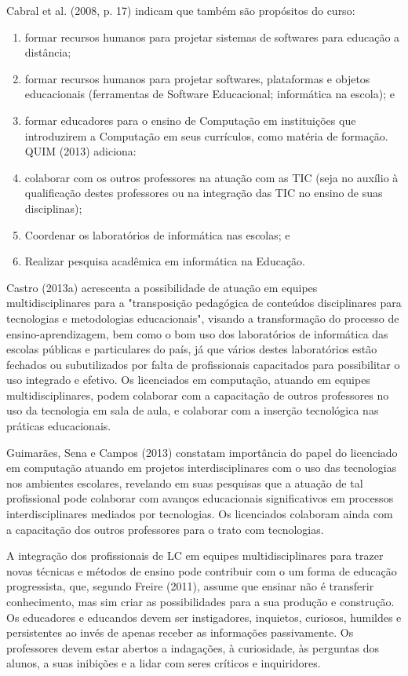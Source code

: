	Cabral et al. (2008, p. 17) indicam que também são propósitos do curso: 
    \begin{enumerate}
	\item formar recursos humanos para projetar sistemas de softwares para educação a distância; 
	\item formar recursos humanos para projetar softwares, plataformas e objetos educacionais (ferramentas de Software Educacional; informática na escola); e 
	\item formar educadores para o ensino de Computação em instituições que introduzirem a Computação em seus currículos, como matéria de formação. 
	QUIM (2013) adiciona:
	\item colaborar com os outros professores na atuação com as TIC (seja no auxílio à qualificação destes professores ou na integração das TIC no ensino de suas disciplinas);
	\item Coordenar os laboratórios de informática nas escolas; e
	\item Realizar pesquisa acadêmica em informática na Educação.
    \end{enumerate}
 
Castro (2013a) acrescenta a possibilidade de atuação em equipes multidisciplinares para a  "transposição pedagógica de conteúdos disciplinares para tecnologias e metodologias educacionais", visando a transformação do processo de ensino-aprendizagem, bem como o bom uso dos laboratórios de informática das escolas públicas e particulares do país, já que vários destes laboratórios estão fechados ou subutilizados por falta de profissionais capacitados para possibilitar o uso integrado e efetivo. Os licenciados em computação, atuando em equipes multidisciplinares, podem colaborar com a capacitação de outros professores no uso da tecnologia em sala de aula, e colaborar com a inserção tecnológica nas práticas educacionais. 


Guimarães, Sena e Campos (2013) constatam importância do papel do licenciado em computação atuando em projetos interdisciplinares com o uso das tecnologias nos ambientes escolares, revelando em suas pesquisas que a atuação de tal profissional pode colaborar com avanços educacionais significativos em processos interdisciplinares mediados por tecnologias. Os licenciados colaboram ainda com a capacitação dos outros professores para o trato com tecnologias.


A integração dos profissionais de LC em equipes multidisciplinares para trazer novas técnicas e métodos de ensino pode contribuir com o um forma de educação progressista, que, segundo Freire (2011), assume que ensinar não é transferir conhecimento, mas sim criar as possibilidades para a sua produção e construção. Os educadores e educandos devem ser instigadores, inquietos, curiosos, humildes e persistentes ao invés de apenas receber as informações passivamente. Os professores devem estar abertos a indagações, à curiosidade, às perguntas dos alunos, a suas inibições e a lidar com seres críticos e inquiridores.


